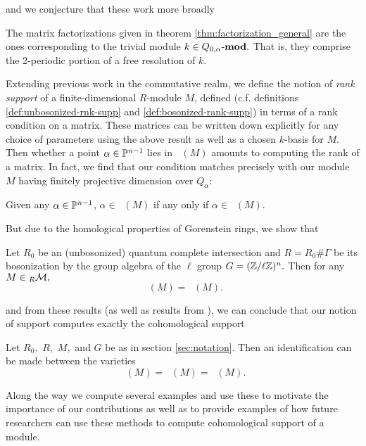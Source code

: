 \documentclass [11pt, proquest] {uwthesis}[2020/02/24]
\DeclareMathOperator{\supphR}{supp^\mathit{hyp}_R}
\DeclareMathOperator{\supphRnaught}{supp^\mathit{hyp}_{R_0}}
\DeclareMathOperator{\suppc}{supp^\mathit{coh}_R}
\DeclareMathOperator{\supprR}{supp^\mathit{rnk}_R}
\DeclareMathOperator{\supprRnaught}{supp^\mathit{rnk}_{R_0}}
\begin{document}
    and we conjecture that these work more broadly
    \begingroup
    \def\thethm{2.18}
    \addtocounter{thm}{-1}
    \begin{conj}
        The matrix factorizations given in theorem \ref{thm:factorization_general} are the ones corresponding to the trivial module $k\in Q_{0,\alpha}\text{-}\mathbf{mod}.$ That is, they comprise the 2-periodic portion of a free resolution of $k$.
    \end{conj}
    \endgroup
    
    Extending previous work in the commutative realm, we define the notion of \textit{rank support} of a finite-dimensional $R$-module $M$, defined (c.f. definitions \ref{def:unbosonized-rnk-supp} and \ref{def:bosonized-rank-supp}) in terms of a rank condition on a matrix. These matrices can be written down explicitly for any choice of parameters using the above result as well as a chosen $k$-basis for $M$. Then whether a point $\alpha\in\mathbb{P}^{n-1}$ lies in $\supprR(M)$ amounts to computing the rank of a matrix. In fact, we find that our condition matches precisely with our module $M$ having finitely projective dimension over $Q_\alpha$:
    \begingroup
    \def\thethm{3.10}
    \addtocounter{thm}{-1}
    \begin{thm} %
        Given any $\alpha\in\mathbb{P}^{n-1}$, $\alpha\in\supprRnaught(M)$ if any only if $\alpha\in \supphRnaught(M).$
    \end{thm}
    \endgroup
    But due to the homological properties of Gorenstein rings, we show that 
    \begingroup
    \def\thethm{6.8}
    \addtocounter{thm}{-1}
    \begin{thm}
        Let $R_0$ be an (unbosonized) quantum complete intersection and $R=R_0\#\Gamma$ be its bosonization by the group algebra of the $\ell$ group $G=(\mathbb{Z}/\ell\mathbb{Z})^n.$ Then for any $M\in{_R\mathcal{M}},$
        \[\supphR(M)=\supphRnaught(M).\]
    \end{thm}
    \endgroup
    \noindent and from these results (as well as results from \cite{negron-pevtsovaI}), we can conclude that our notion of support computes exactly the cohomological support
    \begingroup
    \def\thethm{6.9}
    \addtocounter{thm}{-1}
    \begin{thm}
        Let $R_0,$ $R,$ $M,$ and $G$ be as in section \ref{sec:notation}. Then an identification can be made between the varieties
        \[\suppc(M)=\supprR(M)=\supprRnaught(M).\]
    \end{thm}
    \endgroup
    
    Along the way we compute several examples and use these to motivate the importance of our contributions as well as to provide examples of how future researchers can use these methods to compute cohomological support of a module.
\end{document}
